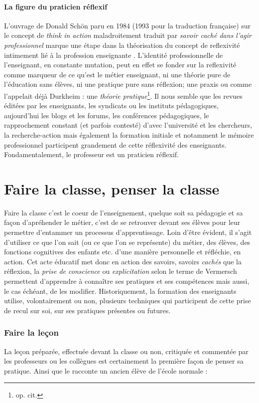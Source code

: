\documentclass[a4paper,11pt]{article}
\begin{document}
			\subsection{La figure du praticien réflexif}
			L'ouvrage de Donald Schön paru en 1984 (1993 pour la traduction française) sur le concept de \emph{think in action} maladroitement traduit par \emph{savoir caché dans l'agir professionnel} marque une étape dans la théorisation du concept de reflexivité intimement lié à la profession enseignante \cite{sch93}. L'identité professionnelle de l'enseignant, en constante mutation, peut en effet se fonder sur la reflexivité comme marqueur de ce qu'est le métier enseignant, ni une théorie pure de l'éducation sans élèves, ni une pratique pure sans réflexion; une praxis ou comme l'appelait déjà Durkheim : une \emph{théorie pratique}\footnote{op. cit.}. Il nous semble que les revues éditées par les enseignants, les syndicats ou les instituts pédagogiques, aujourd'hui les blogs et les forums, les conférences pédagogiques, le rapprochement constant (et parfois contesté) d'avec l'université et les chercheurs, la recherche-action mais également la formation initiale et notamment le mémoire professionnel participent grandement de cette réflexivité des enseignants. Fondamentalement, le professeur est un praticien réflexif. 
			
\part{Faire la classe, penser la classe}
Faire la classe c'est le coeur de l'enseignement, quelque soit sa pédagogie et sa façon d'apréhender le métier, c'est de se retrouver devant ses élèves pour leur permettre d'entammer un processus d'apprentissage. Loin d'être évident, il s'agit d'utiliser ce que l'on sait (ou ce que l'on se représente) du métier, des élèves, des fonctions cognitives des enfants etc. d'une manière personnelle et réfléchie, en action. Cet acte éducatif met donc en action des savoirs, savoirs \emph{cachés} que la réflexion, la \emph{prise de conscience} ou \emph{explicitation} selon le terme de Vermersch \cite{ver94} permettent d'apprendre à connaître ses pratiques et ses compétences mais aussi, le cas échéant, de les modifier. Historiquement, la formation des enseignants utilise, volontairement ou non, plusieurs techniques qui participent de cette prise de recul sur soi, sur ses pratiques présentes ou futures.

			\section{Faire la leçon}
			La leçon préparée, effectuée devant la classe ou non, critiquée et commentée par les professeurs ou les collègues est certainement la première façon de penser sa pratique. Ainsi que le racconte un ancien élève de l'école normale :			
			
\end{document}
